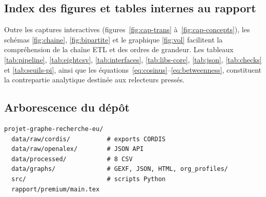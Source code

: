 \documentclass[12pt,a4paper,oneside]{article}
\begin{document}
\subsection{Index des figures et tables internes au rapport}
Outre les captures interactives (figures~\ref{fig:cap-trans} à~\ref{fig:cap-concepts}), les schémas \ref{fig:chaine}, \ref{fig:bipartite} et le graphique \ref{fig:vol} facilitent la compréhension de la chaîne ETL et des ordres de grandeur. Les tableaux \ref{tab:pipeline}, \ref{tab:eightcsv}, \ref{tab:interfaces}, \ref{tab:libs-core}, \ref{tab:json}, \ref{tab:checks} et \ref{tab:seuils-pi}, ainsi que les équations~\ref{eq:cosinus}--\ref{eq:betweenness}, constituent la contrepartie analytique destinée aux relecteurs pressés.

\subsection{Arborescence du dépôt}
\begin{lstlisting}[basicstyle=\ttfamily\footnotesize,breaklines=true]
projet-graphe-recherche-eu/
  data/raw/cordis/          # exports CORDIS
  data/raw/openalex/        # JSON API
  data/processed/           # 8 CSV
  data/graphs/              # GEXF, JSON, HTML, org_profiles/
  src/                      # scripts Python
  rapport/premium/main.tex
\end{lstlisting}
\end{document}

